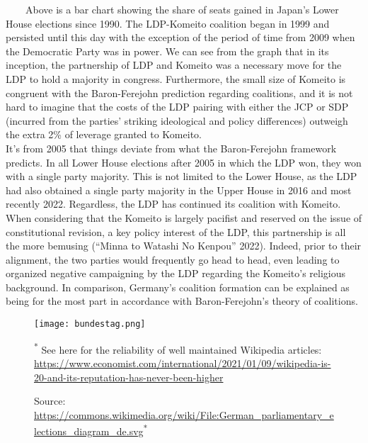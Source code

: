 \documentclass[
]{article}
\begin{document}
~~~~Above is a bar chart showing the share of seats gained in Japan's
Lower House elections since 1990. The LDP-Komeito coalition began in
1999 and persisted until this day with the exception of the period of
time from 2009 when the Democratic Party was in power. We can see from
the graph that in its inception, the partnership of LDP and Komeito was
a necessary move for the LDP to hold a majority in congress.
Furthermore, the small size of Komeito is congruent with the
Baron-Ferejohn prediction regarding coalitions, and it is not hard to
imagine that the costs of the LDP pairing with either the JCP or SDP
(incurred from the parties' striking ideological and policy differences)
outweigh the extra 2\% of leverage granted to Komeito.\\
\hspace*{0.333em}\hspace*{0.333em}\hspace*{0.333em}\hspace*{0.333em}It's
from 2005 that things deviate from what the Baron-Ferejohn framework
predicts. In all Lower House elections after 2005 in which the LDP won,
they won with a single party majority. This is not limited to the Lower
House, as the LDP had also obtained a single party majority in the Upper
House in 2016 and most recently 2022. Regardless, the LDP has continued
its coalition with Komeito. When considering that the Komeito is largely
pacifist and reserved on the issue of constitutional revision, a key
policy interest of the LDP, this partnership is all the more bemusing
({``Minna to Watashi No Kenpou''} 2022). Indeed, prior to their
alignment, the two parties would frequently go head to head, even
leading to organized negative campaigning by the LDP regarding the
Komeito's religious background. In comparison, Germany's coalition
formation can be explained as being for the most part in accordance with
Baron-Ferejohn's theory of coalitions. \newpage

\begin{figure}[!h]
\texttt{[image: bundestag.png]}%
\caption{Source: \url{https://commons.wikimedia.org/wiki/File:German_parliamentary_elections_diagram_de.svg}\textsuperscript{*}}
\small\textsuperscript{*} See here for the reliability of well maintained Wikipedia articles: \url{https://www.economist.com/international/2021/01/09/wikipedia-is-20-and-its-reputation-has-never-been-higher}
\end{figure}
\end{document}

